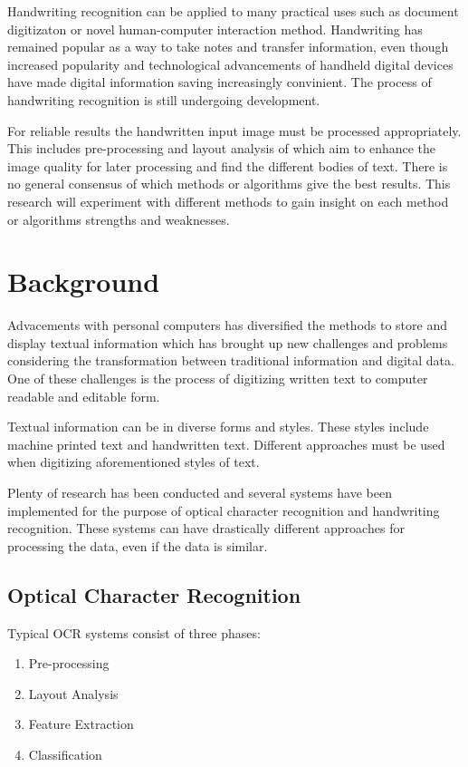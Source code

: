\documentclass{article}
\begin{document}
    Handwriting recognition can be applied to many practical uses such as document digitizaton or novel human-computer interaction method. Handwriting has remained popular as a way to take notes and transfer information, even though increased popularity and technological advancements of handheld digital devices have made digital information saving increasingly convinient. The process of handwriting recognition is still undergoing development.

    For reliable results the handwritten input image must be processed appropriately. This includes pre-processing and layout analysis of which aim to enhance the image quality for later processing and find the different bodies of text. There is no general consensus of which methods or algorithms give the best results. This research will experiment with different methods to gain insight on each method or algorithms strengths and weaknesses.

  \newpage
  \section{Background}
    Advacements with personal computers has diversified the methods to store and display textual information which has brought up new challenges and problems considering the transformation between traditional information and digital data. One of these challenges is the process of digitizing written text to computer readable and editable form.

    Textual information can be in diverse forms and styles. These styles include machine printed text and handwritten text. Different approaches must be used when digitizing aforementioned styles of text.

    Plenty of research has been conducted and several systems have been implemented for the purpose of optical character recognition and handwriting recognition. These systems can have drastically different approaches for processing the data, even if the data is similar.

  \subsection{Optical Character Recognition}
    Typical OCR systems consist of three phases:
    \begin{enumerate}
      \item{Pre-processing}
      \item{Layout Analysis}
      \item{Feature Extraction}
      \item{Classification}
    \end{enumerate}
\end{document}
